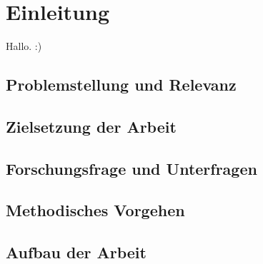 \chapter{Einleitung}
\label{sec:Einleitung}
Hallo. :)


\section{Problemstellung und Relevanz}
\label{sec:Problemstellung}

\section{Zielsetzung der Arbeit}
\label{sec:Zielsetzung}

\section{Forschungsfrage und Unterfragen}
\label{sec:Forschungsfragen}

\section{Methodisches Vorgehen}
\label{sec:MethodischesVorgehenKurz}

\section{Aufbau der Arbeit}
\label{sec:AufbauDerArbeit}
